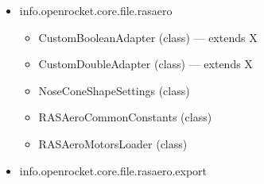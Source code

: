 \documentclass{amsdtx}
\begin{document}
\begin{itemize}
\begin{itemize}
\begin{itemize}
      ShockCordSaver (class) --- extends M
    \item
      StreamerSaver (class) --- extends R
    \item
      StructuralComponentSaver (class) --- extends I
    \item
      SymmetricComponentSaver (class) --- extends B
    \item
      TabControlledTrapezoidFinSetSaver (class) --- extends F
    \item
      ThicknessRingComponentSaver (class) --- extends R
    \item
      TransitionSaver (class) --- extends S
    \item
      TrapezoidFinSetSaver (class) --- extends F
    \item
      TubeCouplerSaver (class) --- extends T
    \item
      TubeFinSetSaver (class) --- extends E
    \item
      names (enum)
    \item
      names (enum)
    \item
      names (enum)
    \item
      names (enum)
    \item
      names (enum)
    \item
      takes (class)
    \end{itemize}
  \item
    info.openrocket.core.file.rasaero

    \begin{itemize}
    
    \item
      CustomBooleanAdapter (class) --- extends X
    \item
      CustomDoubleAdapter (class) --- extends X
    \item
      NoseConeShapeSettings (class)
    \item
      RASAeroCommonConstants (class)
    \item
      RASAeroMotorsLoader (class)
    \end{itemize}
  \item
    info.openrocket.core.file.rasaero.export

    \begin{itemize}
    

\end{itemize}
\end{itemize}
\end{itemize}
\end{document}
